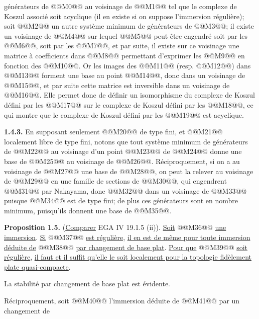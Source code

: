 
générateurs de @@M0@@ au voisinage de @@M1@@ tel que le complexe de Koszul associé soit acyclique (il en existe si on suppose l'immersion régulière); soit @@M2@@ un autre système minimum de générateurs de @@M3@@; il existe un voisinage de @@M4@@ sur lequel @@M5@@ peut être engendré soit par les @@M6@@, soit par les @@M7@@, et par suite, il existe sur ce voisinage une matrice à coefficients dans @@M8@@ permettant d'exprimer les @@M9@@ en fonction des @@M10@@. Or les images des @@M11@@ (resp. @@M12@@) dans @@M13@@ forment une base au point @@M14@@, donc dans un voisinage de @@M15@@, et par suite cette matrice est inversible dans un voisinage de @@M16@@. Elle permet donc de définir un isomorphisme du complexe de Koszul défini par les @@M17@@ sur le complexe de Koszul défini par les @@M18@@, ce qui montre que le complexe de Koszul défini par les @@M19@@ est acyclique.

\textbf{1.4.3.} En supposant seulement @@M20@@ de type fini, et @@M21@@ localement libre de type fini, notons que tout système minimum de générateurs de @@M22@@ au voisinage d'un point @@M23@@ de @@M24@@ donne une base de @@M25@@ au voisinage de @@M26@@. Réciproquement, si on a au voisinage de @@M27@@ une base de @@M28@@, on peut la relever au voisinage de @@M29@@ en une famille de sections de @@M30@@, qui engendrent @@M31@@ par Nakayama, donc @@M32@@ dans un voisinage de @@M33@@ puisque @@M34@@ est de type fini; de plus ces générateurs sont en nombre minimum, puisqu'ils donnent une base de @@M35@@.

\textbf{Proposition 1.5.} (\uline{Comparer} EGA IV 19.1.5 (ii)). \uline{Soit} @@M36@@ \uline{une immersion}. \uline{Si} @@M37@@ \uline{est régulière}, \uline{il en est de même pour toute immersion déduite de} @@M38@@ \uline{par changement de base plat}. \uline{Pour que} @@M39@@ \uline{soit régulière}, \uline{il faut et il suffit qu'elle le soit localement pour la topologie fidèlement plate quasi-compacte}.

La stabilité par changement de base plat est évidente.

Réciproquement, soit @@M40@@ l'immersion déduite de @@M41@@ par un changement de
